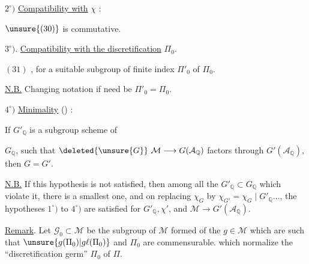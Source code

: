 \(2^\circ)\) \uline{Compatibility with} \(\chi\) :

\(\unsure{(30)}\)
is commutative.

\(3^\circ)\). \uline{Compatibility with the discretification} \(\Pi_0\).

\((31)\)
,
for a suitable subgroup of finite index \(\Pi'_0\) of \(\Pi_0\).

\uline{N.B.} Changing notation if need be  \(\Pi'_0=\Pi_0\).

\(4^\circ)\) \uline{Minimality} () :

If \(G'_{\mathbb{Q}}\) is a subgroup scheme of


\(G_{\mathbb{Q}}\), such that \(\deleted{\unsure{G}}\ \mathcal{M}\longrightarrow G(\mathcal{A}_{\mathbb{Q}})\) factors through \(G'(\mathcal{A}_{\mathbb{Q}})\), then \(G=G'\).

\uline{N.B.} If this hypothesis is not satisfied, then among all the \(G'_{\mathbb{Q}}\subset G_{\mathbb{Q}}\) which violate it, there is a  smallest one, and on replacing \(\chi_G\) by \(\chi_{G'}=\chi_G\mid G'_{\mathbb{Q}}\ldots\), the hypotheses \(1^\circ)\) to \(4^\circ)\) are satisfied for \(G'_{\mathbb{Q}},\chi'\), and \(\mathcal{M}\longrightarrow G'(\mathcal{A}_{\mathbb{Q}})\).

\uline{Remark}. Let \(\mathcal{G}_0\subset\mathcal{M}\) be the subgroup of \(\mathcal{M}\) formed of the \(g\in\mathcal{M}\) which are such that \(\unsure{g(\Pi_0)|g\ell(\Pi_0)}\) and \(\Pi_0\) are commensurable.   which normalize the ``discretification germ'' \(\Pi_0\) of \(\Pi\).

